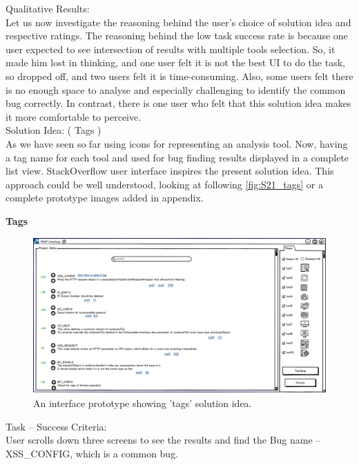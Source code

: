 Qualitative Results: \\

Let us now investigate the reasoning behind the user’s choice of solution idea and respective ratings. The reasoning behind the low task success rate is because one user expected to see intersection of results with multiple tools selection. So, it made him lost in thinking, and one user felt it is not the best UI to do the task, so dropped off, and two users felt it is time-consuming. Also, some users felt there is no enough space to analyse and especially challenging to identify the common bug correctly. In contrast, there is one user who felt that this solution idea makes it more comfortable to perceive. \\


Solution Idea: ( Tags ) \\

As we have seen so far using icons for representing an analysis tool. Now, having a tag name for each tool and used for bug finding results displayed in a complete list view. StackOverflow user interface inspires the present solution idea. This approach could be well understood, looking at following \autoref{fig:S21_tags} or a complete prototype images added in appendix.  \\

\clearpage

\textbf{Tags}
\begin{figure}[hbt!]
	\centering
	\includegraphics[width=\linewidth]{figures/solution_ideas_snaps/S21_tags}
	\caption{An interface prototype showing 'tags' solution idea.}
	\label{fig:S21_tags}
\end{figure}


Task – Success Criteria: \\

User scrolls down three screens to see the results and find the Bug name – XSS\_CONFIG, which is a common bug. \\

